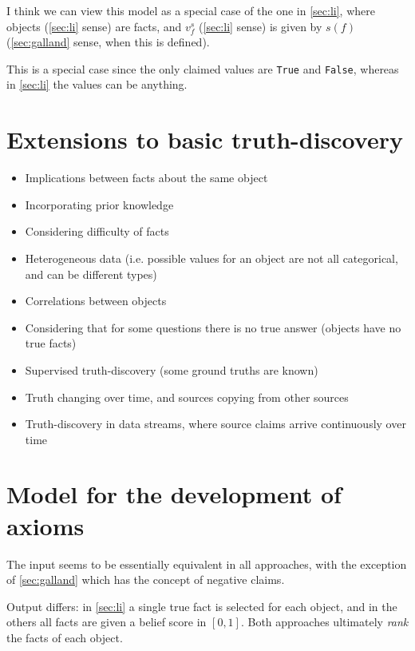 \documentclass{article}
\theoremstyle{definition}
\theoremstyle{plain}
\begin{document}
I think we can view this model as a special case of the one in \ref{sec:li},
where objects (\ref{sec:li} sense) are facts, and $v_f^s$ (\ref{sec:li} sense)
is given by $s(f)$ (\ref{sec:galland} sense, when this is defined).

This is a special case since the only claimed values are \texttt{True} and
\texttt{False}, whereas in \ref{sec:li} the values can be anything.

\section{Extensions to basic truth-discovery}
\begin{itemize}

\item Implications between facts about the same object{\cite{yin_han_yu}}
\item Incorporating prior knowledge{\cite{pasternack}}
\item Considering difficulty of facts{\cite{galland}}
\item Heterogeneous data (i.e. possible values for an object are not all
categorical, and can be different types){\cite{li_conflicts}}
\item Correlations between objects{\cite{yang}}
\item Considering that for some questions there is no true answer (objects have
no true facts){\cite{zhi}}
\item Supervised truth-discovery (some ground truths are
known){\cite{yin_supervised}}
\item Truth changing over time, and sources copying from other
sources{\cite{dong}}
\item Truth-discovery in data streams, where source claims arrive continuously
over time{\cite{zhao}}

\end{itemize}

\section{Model for the development of axioms}

The input seems to be essentially equivalent in all approaches, with the
exception of \ref{sec:galland} which has the concept of negative claims.

Output differs: in \ref{sec:li} a single true fact is selected for each object,
and in the others all facts are given a belief score in $[0, 1]$. Both
approaches ultimately \emph{rank} the facts of each object.
\end{document}
